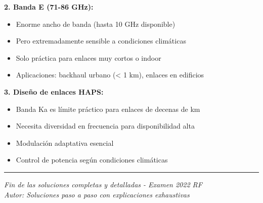 \documentclass[a4paper,10pt]{article}
\begin{document}
\textbf{2. Banda E (71-86 GHz):}
\begin{itemize}
    \item Enorme ancho de banda (hasta 10 GHz disponible)
    \item Pero extremadamente sensible a condiciones climáticas
    \item Solo práctica para enlaces muy cortos o indoor
    \item Aplicaciones: backhaul urbano (< 1 km), enlaces en edificios
\end{itemize}

\textbf{3. Diseño de enlaces HAPS:}
\begin{itemize}
    \item Banda Ka es límite práctico para enlaces de decenas de km
    \item Necesita diversidad en frecuencia para disponibilidad alta
    \item Modulación adaptativa esencial
    \item Control de potencia según condiciones climáticas
\end{itemize}

\vspace{1cm}
\hrule
\begin{center}
\textit{Fin de las soluciones completas y detalladas - Examen 2022 RF}\\
\textit{Autor: Soluciones paso a paso con explicaciones exhaustivas}
\end{center}
\end{document}
